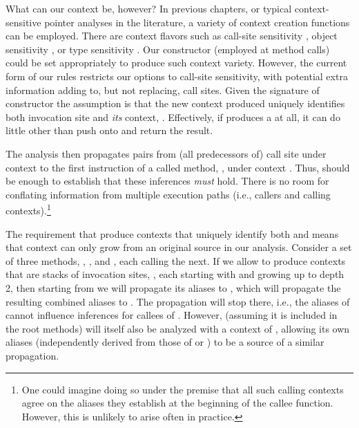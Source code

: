 What can our context be, however? In previous chapters, or typical context-sensitive pointer analyses in the literature, a variety of context creation functions can be employed. There are context flavors such as call-site sensitivity \cite{col:1981:Sharir,thesis:Shivers}, object sensitivity \cite{issta:2002:Milanova,article:2005:Milanova}, or type sensitivity \cite{popl:2011:Smaragdakis}. Our  constructor (employed at method calls) could be set appropriately to produce such context variety. However, the current form of our rules restricts our options to call-site sensitivity, with potential extra information adding to, but not replacing, call sites. Given the signature of constructor  the assumption is that the new context produced uniquely identifies both invocation site  and \emph{its} context, . Effectively, if  produces a  at all, it can do little other than push  onto  and return the result.

The analysis then propagates  pairs from (all predecessors of) call site  under context  to the first instruction of a called method, , under context . Thus,  should be enough to establish that these inferences \emph{must} hold. There is no room for conflating information from multiple execution paths (i.e., callers and calling contexts).\footnote{One could imagine doing so under the premise that all such calling contexts agree on the aliases they establish at the beginning of the callee function. However, this is unlikely to arise often in practice.}

The requirement that  produce contexts that uniquely identify both  and  means that context can only grow from an original source in our analysis. Consider a set of three methods, , , and , each calling the next. If we allow  to produce contexts that are stacks of invocation sites, , each starting with \dlAll{} and growing up to depth 2, then starting from  we will propagate its aliases to , which will propagate the resulting combined aliases to . The propagation will stop there, i.e., the aliases of  cannot influence inferences for callees of . However,  (assuming it is included in the root methods) will itself also be analyzed with a context of \dlAll{}, allowing its own aliases (independently derived from those of  or ) to be a source of a similar propagation.


